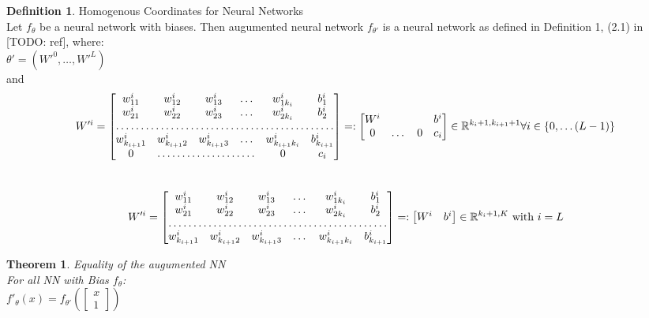 \documentclass[a4paper]{article}
\newtheorem{theorem}{Theorem}[section]
\theoremstyle{definition}
\newtheorem{definition}{Definition}[section]
\begin{document}
\theoremstyle{definition}
\begin{definition}{Homogenous Coordinates for Neural Networks}\\
Let $f_{\theta}$ be a neural network with biases. Then augumented neural network $f_{\theta'}$ is a neural network as defined in Definition 1, (2.1) in [TODO: ref], where:\\
$\theta' = (W'^0, \dots, W'^L)$\\
and\\
\[
W'^i=\begin{bmatrix}
    w_{11}^i       & w_{12}^i & w_{13}^i & \dots & w_{1k_i}^i & b_1^i\\
    w_{21}^i       & w_{22}^i & w_{23}^i & \dots & w_{2k_i}^i & b_2^i\\
    \hdotsfor{6} \\
	w_{k_{i+1}1}^i       & w_{k_{i+1}2}^i & w_{k_{i+1}3}^i & \dots & w_{k_{i+1}k_i}^i & b_{k_{i+1}}^i\\
	0 & \hdotsfor{3} & 0 & c_i
\end{bmatrix}
=: 
\begin{bmatrix}
    W^i & & & b^i\\
	0 & \dots & 0 & c_i
\end{bmatrix} \in \mathbb{R}^{k_i + 1, k_{i + 1} + 1}  \forall i \in \{0, \dots (L-1)\}
\]\\
\[
W'^i=\begin{bmatrix}
    w_{11}^i       & w_{12}^i & w_{13}^i & \dots & w_{1k_i}^i & b_1^i\\
    w_{21}^i       & w_{22}^i & w_{23}^i & \dots & w_{2k_i}^i & b_2^i\\
    \hdotsfor{6} \\
	w_{k_{i+1}1}^i       & w_{k_{i+1}2}^i & w_{k_{i+1}3}^i & \dots & w_{k_{i+1}k_i}^i & b_{k_{i+1}}^i\\
\end{bmatrix}
=: 
\begin{bmatrix}
    W^i & b^i
\end{bmatrix} \in \mathbb{R}^{k_i + 1, K}  \text{ with } i = L
\]
\end{definition}

\begin{theorem}{Equality of the augumented NN}\\
For all NN with Bias $f_{\theta}$:\\
$f'_{\theta}(x)=f_{\theta'}(\begin{bmatrix}x\\1\end{bmatrix})$
\end{theorem}
\end{document}
